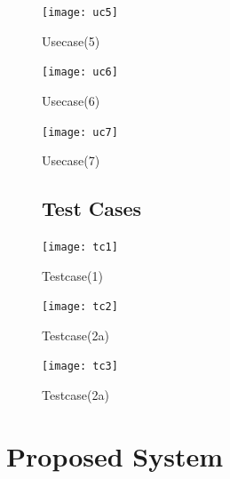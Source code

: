 \begin{figure}[h]
\begin{center}
\texttt{[image: uc5]}
\caption{Usecase(5)}
\label{fig:15}
\end{center}
\end{figure}

\begin{figure}[h]
\begin{center}
\texttt{[image: uc6]}
\caption{Usecase(6)}
\label{fig:16}
\end{center}
\end{figure}

\begin{figure}[h]
\begin{center}
\texttt{[image: uc7]}
\caption{Usecase(7)}
\label{fig:17}
\end{center}
\end{figure}

\begin{figure}[h]
\subsection{Test Cases}
\begin{center}
\texttt{[image: tc1]}
\caption{Testcase(1)}
\label{fig:18}
\end{center}
\end{figure}

\begin{figure}[h]
\begin{center}
\texttt{[image: tc2]}
\caption{Testcase(2a)}
\label{fig:19}
\end{center}
\end{figure}

\begin{figure}[h]
\begin{center}
\texttt{[image: tc3]}
\caption{Testcase(2a)}
\label{fig:20}
\end{center}
\end{figure}


\clearpage


\section{Proposed System}

